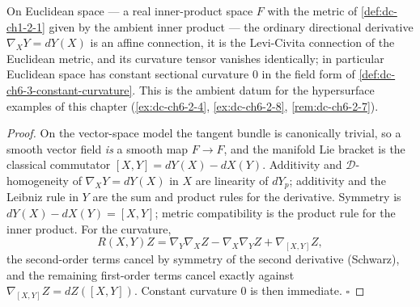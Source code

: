 \begin{lemma}
  \label{lem:dc-ch6-2-8-euclidean}
  \leanok
  On Euclidean space — a real inner-product space $F$ with the metric of
  \cref{def:dc-ch1-2-1} given by the ambient inner product — the ordinary
  directional derivative $\nabla_XY=dY(X)$ is an affine connection, it is the
  Levi-Civita connection of the Euclidean metric, and its curvature tensor
  vanishes identically; in particular Euclidean space has constant sectional
  curvature $0$ in the field form of \cref{def:dc-ch6-3-constant-curvature}.
  This is the ambient datum for the hypersurface examples of this chapter
  (\cref{ex:dc-ch6-2-4}, \cref{ex:dc-ch6-2-8}, \cref{rem:dc-ch6-2-7}).
\end{lemma}
\begin{proof}
  \leanok
  On the vector-space model the tangent bundle is canonically trivial, so a
  smooth vector field \emph{is} a smooth map $F\to F$, and the manifold Lie
  bracket is the classical commutator $[X,Y]=dY(X)-dX(Y)$. Additivity and
  $\mathcal{D}$-homogeneity of $\nabla_XY=dY(X)$ in $X$ are linearity of
  $dY_p$; additivity and the Leibniz rule in $Y$ are the sum and product rules
  for the derivative. Symmetry is $dY(X)-dX(Y)=[X,Y]$; metric compatibility is
  the product rule for the inner product. For the curvature,
  $$
  R(X,Y)Z=\nabla_Y\nabla_XZ-\nabla_X\nabla_YZ+\nabla_{[X,Y]}Z ,
  $$
  the second-order terms cancel by symmetry of the second derivative
  (Schwarz), and the remaining first-order terms cancel exactly against
  $\nabla_{[X,Y]}Z=dZ([X,Y])$. Constant curvature $0$ is then immediate.
  $\square$
\end{proof}

